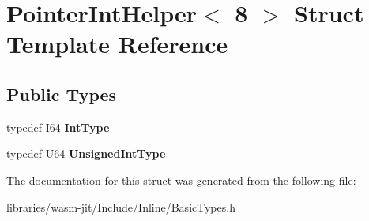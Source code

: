 \hypertarget{struct_pointer_int_helper_3_018_01_4}{}\section{Pointer\+Int\+Helper$<$ 8 $>$ Struct Template Reference}
\label{struct_pointer_int_helper_3_018_01_4}
\subsection*{Public Types}
\begin{DoxyCompactItemize}
\item 
\mbox{\label{struct_pointer_int_helper_3_018_01_4_aaf748436a90226ddc17b5eab9b25d474}} 
typedef I64 {\bfseries Int\+Type}
\item 
\mbox{\label{struct_pointer_int_helper_3_018_01_4_a159933da0e0bef356dfd4caac001deab}} 
typedef U64 {\bfseries Unsigned\+Int\+Type}
\end{DoxyCompactItemize}


The documentation for this struct was generated from the following file\+:\begin{DoxyCompactItemize}
\item 
libraries/wasm-\/jit/\+Include/\+Inline/Basic\+Types.\+h\end{DoxyCompactItemize}
